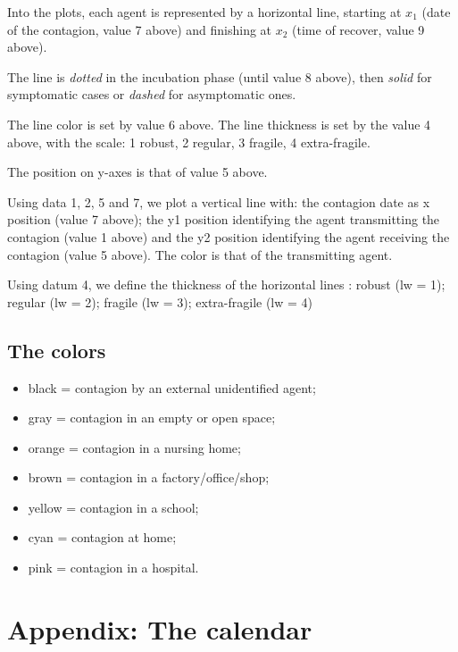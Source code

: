 \documentclass[11pt]{article}
\begin{document}
Into the plots, each agent is represented by a horizontal line, starting at $x_1$ (date of the contagion, value 7 above) and finishing at $x_2$ (time of recover, value 9 above). 

The line is \emph{dotted} in the incubation phase (until value 8 above), then \emph{solid} for symptomatic cases or \emph{dashed} for asymptomatic ones. 

The line color is set by value 6 above. The line thickness is set by the value 4 above, with the scale: 1 robust, 2 regular, 3 fragile, 4 extra-fragile.

The position on y-axes is that of value 5 above. 

Using data 1, 2, 5 and 7, we plot a vertical line with: the contagion date as x position (value 7 above); the y1 position identifying the agent transmitting the contagion (value 1 above) and the y2 position identifying the agent receiving the contagion (value 5 above). The color is that of the transmitting agent.

Using  datum 4, we define the thickness of the horizontal lines : robust (lw = 1); regular (lw = 2); fragile (lw = 3); extra-fragile (lw = 4)

\subsection{The colors}
\begin{itemize}
\setlength{\itemsep}{0pt}
\item   black = contagion by an external unidentified agent;
\item    gray =  contagion in an empty or open space;
\item    orange = contagion in a nursing home;
\item    brown = contagion in a factory/office/shop;
\item    yellow = contagion in a school;
\item    cyan = contagion at home;
\item    pink = contagion in a hospital.
\end{itemize}


\section{Appendix: The calendar}
\label{appCalendar}
\end{document}
